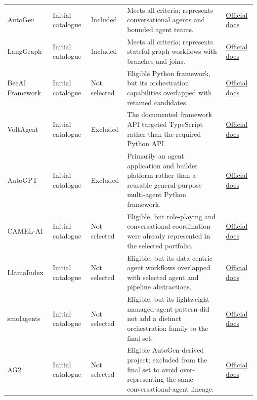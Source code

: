 \begin{longtable}{
    @{}
    p{}
    p{}
    >{\centering\arraybackslash}p{}
    p{}
    p{}
    @{}
}
    AutoGen
    & Initial catalogue
    & \cellcolor{green!25}Included
    & Meets all criteria; represents conversational agents and bounded agent
    teams.
    & \href{https://microsoft.github.io/autogen/stable/}{Official docs} \\

    LangGraph
    & Initial catalogue
    & \cellcolor{green!25}Included
    & Meets all criteria; represents stateful graph workflows with branches
    and joins.
    & \href{https://docs.langchain.com/oss/python/langgraph/overview}
    {Official docs} \\

    BeeAI Framework
    & Initial catalogue
    & Not selected
    & Eligible Python framework, but its orchestration capabilities overlapped
    with retained candidates.
    & \href{https://framework.beeai.dev/}{Official docs} \\

    VoltAgent
    & Initial catalogue
    & Excluded
    & The documented framework API targeted TypeScript rather than the required
    Python API.
    & \href{https://voltagent.dev/docs/}{Official docs} \\

    AutoGPT
    & Initial catalogue
    & Excluded
    & Primarily an agent application and builder platform rather than a
    reusable general-purpose multi-agent Python framework.
    & \href{https://docs.agpt.co/platform/}{Official docs} \\

    CAMEL-AI
    & Initial catalogue
    & Not selected
    & Eligible, but role-playing and conversational coordination were already
    represented in the selected portfolio.
    & \href{https://docs.camel-ai.org/}{Official docs} \\

    LlamaIndex
    & Initial catalogue
    & Not selected
    & Eligible, but its data-centric agent workflows overlapped with selected
    agent and pipeline abstractions.
    & \href{https://docs.llamaindex.ai/en/stable/}{Official docs} \\

    smolagents
    & Initial catalogue
    & Not selected
    & Eligible, but its lightweight managed-agent pattern did not add a
    distinct orchestration family to the final set.
    & \href{https://huggingface.co/docs/smolagents/}{Official docs} \\

    AG2
    & Initial catalogue
    & Not selected
    & Eligible AutoGen-derived project; excluded from the final set to avoid
    over-representing the same conversational-agent lineage.
    & \href{https://docs.ag2.ai/}{Official docs} \\


\end{longtable}
